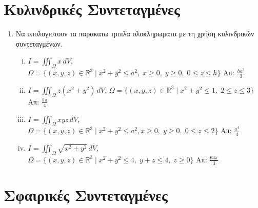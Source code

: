 


\geometry{top=1.9cm}

\pagestyle{askhseis}
\everymath{\displaystyle}



\begin{center}
  \minibox[c]{\large\bf \textcolor{Col1}{Ασκήσεις Τριπλό Ολοκλήρωμα} \\ 
\textcolor{Col1}{(Αλλαγη μεταβλητων)}}
\end{center}


\section*{Κυλινδρικές Συντεταγμένες}

\begin{enumerate}
  \item Να υπολογιστουν τα παρακατω τριπλα ολοκληρωματα με τη χρήση 
    κυλινδρικών συντεταγμένων.

    \begin{enumerate}[i)]
      \item $ I=\iiint_{\Omega} x\,dV $, \quad $ \Omega = 
        \{(x,y,z)\in \mathbb{R}^{3} \mid x^{2}+y^{2} \leq a^{2},\; x 
        \geq 0,\; y \geq 0,\; 0 \leq z \leq h \}  $ 
        \hfill Απ: $ \frac{ha^{3}}{3} $  
      \item $ I=\iiint_{\Omega} z(x^{2}+y^{2})\,dV $, \quad $ \Omega = \{(x,y,z)\in
        \mathbb{R}^{3} \mid x^{2}+y^{2} \leq 1,\; 2 \leq z \leq 3 \} $ 
        \hfill Απ: $ \frac{5 \pi }{4} $ 
      \item $ I=\iiint_{\Omega}xyz\,dV $, \quad $ \Omega = \{(x,y,z)\in \mathbb{R}^{3} 
        \mid x^{2}+y^{2} \leq a^{2}, x \geq 0,\; y \geq 0,\; 0 \leq z \leq 2 \} $ 
        \hfill Απ: $ \frac{a^{4}}{4} $ 
      \item $ I=\iiint_{\Omega} \sqrt{ x^{2}+y^{2} }\, dV $, \quad $ \Omega = 
        \{(x,y,z)\in \mathbb{R}^{3} \mid x^{2}+y^{2} \leq 4,\; y+z \leq 4,\; z \geq 0\}$ 
        \hfill Απ: $ \frac{64 \pi}{3} $ 
    \end{enumerate}
\end{enumerate}


\section*{Σφαιρικές Συντεταγμένες}


